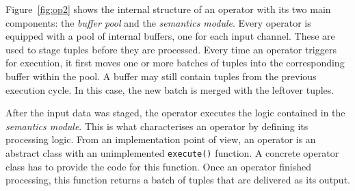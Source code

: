 Figure~\ref{fig:op2} shows the internal structure of an operator with its two main components: the
\textit{buffer pool} and the \textit{semantics module}. Every operator is equipped with a pool of
internal buffers, one for each input channel. These are used to stage tuples before they are processed. Every
time an operator triggers for execution, it first moves one or more batches of tuples into the
corresponding buffer within the pool.
A buffer may still contain tuples from the previous execution cycle. In this case,
the new batch is merged with the leftover tuples.

After the input data was staged, the operator executes the logic contained in the \textit{semantics 
module}. This is what characterises an operator by defining its processing logic.
From an implementation point of view, an operator is an abstract class with an unimplemented
\texttt{execute()} function. A concrete operator class has to provide the code for this function. 
Once an operator finished processing, this function returns a batch of tuples that are delivered as its
output.
